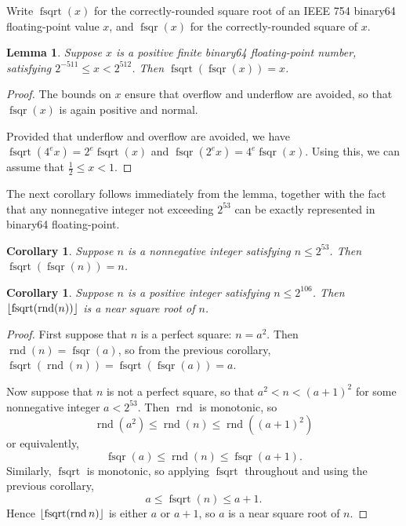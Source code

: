 \documentclass[a4paper]{article}
\DeclarePairedDelimiter\floor{\lfloor}{\rfloor}
\DeclareMathOperator{\rnd}{rnd}
\DeclareMathOperator{\fsqrt}{fsqrt}
\DeclareMathOperator{\fsqr}{fsqr}
\theoremstyle{plain}
\newtheorem{lemma}[theorem]{Lemma}
\newtheorem{corollary}[theorem]{Corollary}
\theoremstyle{definition}
\begin{document}
Write $\fsqrt(x)$ for the correctly-rounded square root of an IEEE 754 binary64
floating-point value $x$, and $\fsqr(x)$ for the correctly-rounded square
of $x$.

\begin{lemma}
  Suppose $x$ is a positive finite binary64 floating-point number, satisfying
  $2^{-511} \le x < 2^{512}$. Then $\fsqrt(\fsqr(x)) = x$.
\end{lemma}

\begin{proof}
  The bounds on $x$ ensure that overflow and underflow are avoided, so
  that $\fsqr(x)$ is again positive and normal.

  Provided that underflow and overflow are avoided, we have $\fsqrt(4^e x) =
  2^e \fsqrt(x)$ and $\fsqr(2^e x) = 4^e \fsqr(x)$. Using this, we can
  assume that $\frac 12 \le x < 1$.


\end{proof}

The next corollary follows immediately from the lemma, together with the
fact that any nonnegative integer not exceeding $2^{53}$ can be exactly
represented in binary64 floating-point.

\begin{corollary}
  Suppose $n$ is a nonnegative integer satisfying $n \le 2^{53}$. Then
  $\fsqrt(\fsqr(n)) = n$.
\end{corollary}

\begin{corollary}
  Suppose $n$ is a positive integer satisfying $n \le 2^{106}$. Then
  $\floor{\fsqrt(\rnd(n))}$ is a near square root of $n$.
\end{corollary}

\begin{proof}
  First suppose that $n$ is a perfect square: $n = a^2$. Then $\rnd(n) =
  \fsqr(a)$, so from the previous corollary, $\fsqrt(\rnd(n)) =
  \fsqrt(\fsqr(a)) = a$.

  Now suppose that $n$ is not a perfect square, so that $a^2 < n < (a+1)^2$
  for some nonnegative integer $a < 2^{53}$. Then $\rnd$ is monotonic, so
    $$\rnd(a^2) \le \rnd(n) \le \rnd((a+1)^2)$$
  or equivalently,
    $$\fsqr(a) \le \rnd(n) \le \fsqr(a+1).$$
  Similarly, $\fsqrt$ is monotonic, so applying $\fsqrt$ throughout
  and using the previous corollary,
    $$a \le \fsqrt(n) \le a + 1.$$
  Hence $\floor{\fsqrt(\rnd n)}$ is either $a$ or $a+1$, so $a$ is a near
  square root of $n$.
\end{proof}
\end{document}
